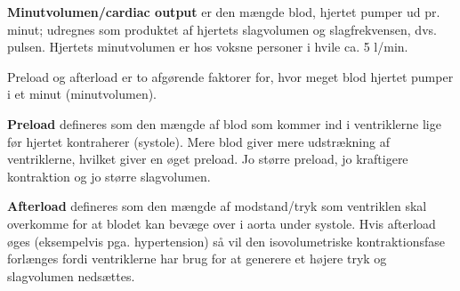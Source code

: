 \textbf{Minutvolumen/cardiac output} er den mængde blod, hjertet pumper ud pr. minut; udregnes som produktet af hjertets slagvolumen og slagfrekvensen, dvs. pulsen. Hjertets minutvolumen er hos voksne personer i hvile ca. 5 l/min. 

Preload og afterload er to afgørende faktorer for, hvor meget blod hjertet pumper i et minut (minutvolumen).

\textbf{Preload} defineres som den mængde af blod som kommer ind i ventriklerne lige før hjertet kontraherer (systole). Mere blod giver mere udstrækning af ventriklerne, hvilket giver en øget preload. Jo større preload, jo kraftigere kontraktion og jo større slagvolumen. 

\textbf{Afterload} defineres som den mængde af modstand/tryk som ventriklen skal overkomme for at blodet kan bevæge over i aorta under systole. Hvis afterload øges (eksempelvis pga. hypertension) så vil den isovolumetriske kontraktionsfase forlænges fordi ventriklerne har brug for at generere et højere tryk og slagvolumen nedsættes. 

